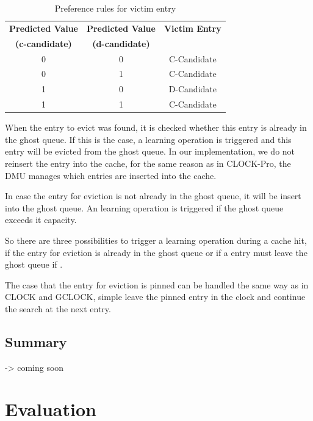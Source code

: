 \documentclass[
	12pt,
	a4paper,
	abstract,
	bibliography=totoc,
	chapterprefix,
	headings=openright,
	numbers=endperiod,
	parskip=half,
	twoside,
]{scrreprt}
\begin{document}
\begin{table}[ht]
	\centering
	\begin{tabular}{|c|c|c|}
		\hline
		\textbf{Predicted Value} & \textbf{Predicted Value} & \textbf{Victim Entry} \\
		\textbf{(c-candidate)} & \textbf{(d-candidate)} & \\
		\hline
		0 & 0 & C-Candidate \\
		\hline
		0 & 1 & C-Candidate \\
		\hline
		1 & 0 & D-Candidate \\
		\hline
		1 & 1 & C-Candidate \\
		\hline
	\end{tabular}
	\caption{Preference rules for victim entry}
	\label{tab:ml-clock preference rules}
\end{table}

When the entry to evict was found,
it is checked whether this entry is already in the ghost queue.
If this is the case, a learning operation is triggered and this entry will be evicted from the ghost queue.
In our implementation, we do not reinsert the entry into the cache, for the same reason as in CLOCK-Pro, the DMU
manages which entries are inserted into the cache.

In case the entry for eviction is not already in the ghost queue, it will be insert into the ghost queue.
An learning operation is triggered if the ghost queue exceeds it capacity.

So there are three possibilities to trigger a learning operation during a cache hit, 
if the entry for eviction is already in the ghost queue or
if a entry must leave the ghost queue if .

The case that the entry for eviction is pinned can be handled the same way as in CLOCK and GCLOCK, simple leave the pinned entry in the clock and continue the search at the next entry.


\section{Summary}

-> coming soon



\chapter{Evaluation}
\label{cha:evaluation}

\end{document}
